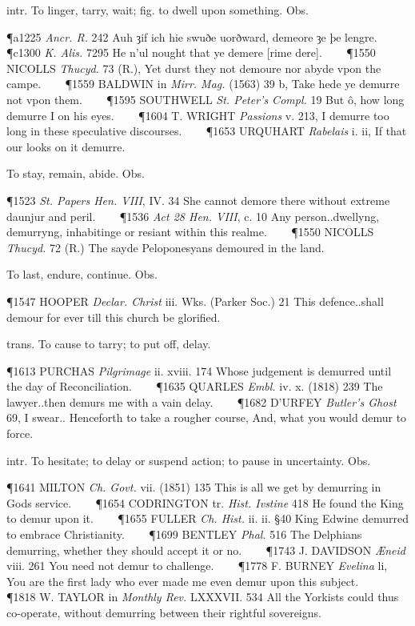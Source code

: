 \begin{description}[wide, labelwidth=!, labelindent=0pt]
\begin{myenumerate}

 intr. To linger, tarry, wait; fig. to dwell upon something. Obs.

\P a1225  \textit{Ancr. R.} 242 Auh ȝif ich hie swuðe uorðward, demeore ȝe þe lengre.    
\P c1300 \textit{K. Alis.}  7295 He n'ul nought that ye demere [rime dere].    
\P 1550 NICOLLS  \textit{Thucyd.} 73 (R.), Yet durst they not demoure nor abyde vpon the campe.    
\P 1559 BALDWIN in  \textit{Mirr. Mag.} (1563) 39 b, Take hede ye demurre not vpon them.    
\P 1595 SOUTHWELL  \textit{St. Peter's Compl.} 19 But ô, how long demurre I on his eyes.    
\P 1604 T. WRIGHT  \textit{Passions} v. 213, I demurre too long in these speculative discourses.    
\P 1653 URQUHART  \textit{Rabelais} i. ii, If that our looks on it demurre.

 To stay, remain, abide. Obs.

\P 1523 \textit{St. Papers  Hen. VIII}, IV. 34 She cannot demore there without extreme daunjur and peril.    
\P 1536  \textit{Act 28 Hen. VIII}, c. 10 Any person..dwellyng, demurryng, inhabitinge or resiant within this realme.    
\P 1550 NICOLLS  \textit{Thucyd.} 72 (R.) The sayde Peloponesyans demoured in the land.

 To last, endure, continue. Obs.

\P 1547 HOOPER  \textit{Declar. Christ} iii. Wks. (Parker Soc.) 21 This defence..shall demour for ever till this church be glorified.

 trans. To cause to tarry; to put off, delay.

\P 1613 PURCHAS  \textit{Pilgrimage} ii. xviii. 174 Whose judgement is demurred until the day of Reconciliation.    
\P 1635 QUARLES  \textit{Embl.} iv. x. (1818) 239 The lawyer..then demurs me with a vain delay.    
\P 1682 D'URFEY  \textit{Butler's Ghost} 69, I swear.. Henceforth to take a rougher course, And, what you would demur to force.

 intr. To hesitate; to delay or suspend action; to pause in uncertainty. Obs.

\P 1641 MILTON  \textit{Ch. Govt.} vii. (1851) 135 This is all we get by demurring in Gods service.    
\P 1654 CODRINGTON tr.  \textit{Hist. Ivstine} 418 He found the King to demur upon it.    
\P 1655 FULLER  \textit{Ch. Hist.} ii. ii. §40 King Edwine demurred to embrace Christianity.    
\P 1699 BENTLEY  \textit{Phal.} 516 The Delphians demurring, whether they should accept it or no.    
\P 1743 J. DAVIDSON  \textit{Æneid} viii. 261 You need not demur to challenge.    
\P 1778 F. BURNEY  \textit{Evelina} li, You are the first lady who ever made me even demur upon this subject.    
\P 1818 W. TAYLOR in  \textit{Monthly Rev.} LXXXVII. 534 All the Yorkists could thus co-operate, without demurring between their rightful sovereigns.


\end{myenumerate}
\end{description}

